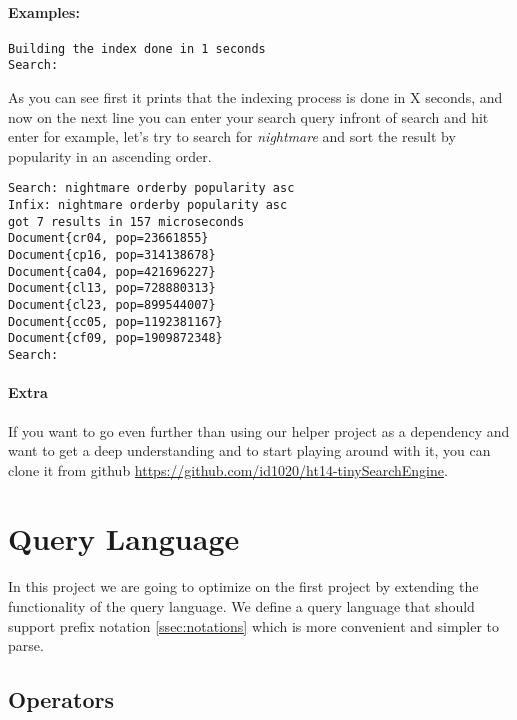 \documentclass[11pt]{article}
\begin{document}
\paragraph{\textbf{Examples:}}
\begin{verbatim}
Building the index done in 1 seconds
Search: 
\end{verbatim}

As you can see first it prints that the indexing process is done in X seconds, and now on the next line you can enter your search query infront of search and hit enter for example, let's try to search for \textit{nightmare} and sort the result by popularity in an ascending order. 

\begin{verbatim}
Search: nightmare orderby popularity asc
Infix: nightmare orderby popularity asc
got 7 results in 157 microseconds
Document{cr04, pop=23661855}
Document{cp16, pop=314138678}
Document{ca04, pop=421696227}
Document{cl13, pop=728880313}
Document{cl23, pop=899544007}
Document{cc05, pop=1192381167}
Document{cf09, pop=1909872348}
Search: 
\end{verbatim}
 
\paragraph{Extra} If you want to go even further than using our helper project as a dependency and want to get a deep understanding and to start playing around with it, you can clone it from github \url{https://github.com/id1020/ht14-tinySearchEngine}.

\section{Query Language}
\label{sec:queries}

In this project we are going to optimize on the first project by extending the functionality of the query language.
We define a query language that should support prefix notation \ref{ssec:notations} which is more convenient  and simpler to parse. 

\subsection{Operators}
\label{ssec:operators}
\end{document}
